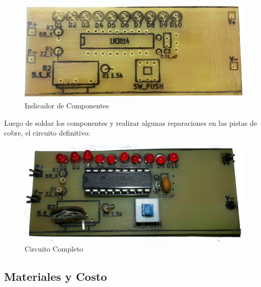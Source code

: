 \documentclass[12pt,a4paper]{article}
\begin{document}
			\begin{figure}[H]
			\centering
				\includegraphics[scale=0.25]{images/ayuda_comps.jpg}\caption{Indicador de Componentes}
			\end{figure}

			Luego de soldar los componentes y realizar algunas reparaciones en las pistas de cobre, el circuito definitivo:

			\begin{figure}[H]
			\centering
				\includegraphics[scale=0.1]{images/placa_completa.jpg}\caption{Circuito Completo}
			\end{figure}

		\subsection{Materiales y Costo}
\end{document}
